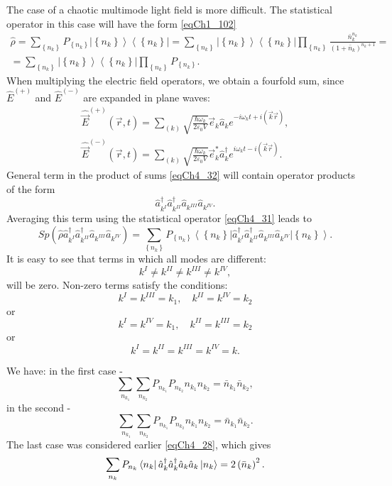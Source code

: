The case of a chaotic multimode light field is more difficult. The statistical operator in this case will have the form \eqref{eqCh1_102} 
\begin{eqnarray}
\hat{\rho} = \sum_{\left\{n_k\right\}} P_{\left\{n_k\right\}} \left|\left\{n_k\right\}\right>\left<\left\{n_k\right\}\right| = 
\sum_{\left\{n_k\right\}} 
 \left|\left\{n_k\right\}\right>\left<\left\{n_k\right\}\right|
\prod_{\left\{n_k\right\}} 
\frac{\bar{n}_k^{n_k}}{\left(1 + \bar{n}_k\right)^{n_k+1}} = 
\nonumber \\
= 
\sum_{\left\{n_k\right\}} 
 \left|\left\{n_k\right\}\right>\left<\left\{n_k\right\}\right|
\prod_{\left\{n_k\right\}} P_{\left\{n_k\right\}}.
\label{eqCh4_31}
\end{eqnarray}
When multiplying the electric field operators, we obtain a fourfold sum, since $\hat{E}^{(+)}$ and $\hat{E}^{(-)}$ are expanded in plane waves: 
\begin{eqnarray}
\hat{\vec{E}}^{(+)}\left(\vec{r}, t\right) = \sum_{(k)}
\sqrt{\frac{\hbar \omega_k}{2 \varepsilon_0 V}} \vec{e}_k \hat{a}_k
e^{-i \omega_k t + i \left(\vec{k} \vec{r}\right)},
\nonumber \\
\hat{\vec{E}}^{(-)}\left(\vec{r}, t\right) = \sum_{(k)}
\sqrt{\frac{\hbar \omega_k}{2 \varepsilon_0 V}} \vec{e}_k^{*} \hat{a}_k^{\dag}
e^{i \omega_k t - i \left(\vec{k} \vec{r}\right)}.
\label{eqCh4_32}
\end{eqnarray}
General term in the product of sums \eqref{eqCh4_32} will contain operator products of the form 
\begin{equation}
\hat{a}^{\dag}_{k^{I}}\hat{a}^{\dag}_{k^{II}}\hat{a}_{k^{III}}\hat{a}_{k^{IV}}.
\label{eqCh4_33}
\end{equation}
Averaging this term using the statistical operator \eqref{eqCh4_31} leads to
\[
Sp\left(\hat{\rho}
\hat{a}^{\dag}_{k^{I}}\hat{a}^{\dag}_{k^{II}}\hat{a}_{k^{III}}\hat{a}_{k^{IV}}
\right) = 
\sum_{\left\{n_k\right\}} P_{\left\{n_k\right\}}
\left<\left\{n_k\right\}\right|
\hat{a}^{\dag}_{k^{I}}\hat{a}^{\dag}_{k^{II}}\hat{a}_{k^{III}}\hat{a}_{k^{IV}}
\left|\left\{n_k\right\}\right>.
\]
It is easy to see that terms in which all modes are different: 
\[
k^{I} \neq k^{II} \neq k^{III} \neq k^{IV},
\]
will be zero. Non-zero terms satisfy the conditions:
\[
k^{I} = k^{III} = k_1, \quad k^{II} = k^{IV} = k_2
\]
or
\[
k^{I} = k^{IV} = k_1, \quad k^{II} = k^{III} = k_2
\]
or
\[
k^{I} = k^{II} =  k^{III} = k^{IV} = k.
\]   

We have: in the first case -
\begin{equation}
\sum_{n_{k_1}}\sum_{n_{k_2}} P_{n_{k_1}} P_{n_{k_2}} 
n_{k_1} n_{k_2} = \bar{n}_{k_1} \bar{n}_{k_2},
\label{eqCh4_34}
\end{equation}
in the second -
\begin{equation}
\sum_{n_{k_1}}\sum_{n_{k_2}} P_{n_{k_1}} P_{n_{k_2}} 
n_{k_1} n_{k_2} = \bar{n}_{k_1} \bar{n}_{k_2}.
\label{eqCh4_35}
\end{equation}
The last case was considered earlier \eqref{eqCh4_28}, which gives
\begin{equation}
\sum_{n_{k}} P_{n_{k}}
\bra{n_k}\hat{a}_k^{\dag}\hat{a}_k^{\dag}\hat{a}_k\hat{a}_k\ket{n_k}
= 2 \left(\bar{n}_k\right)^2.
\label{eqCh4_36}
\end{equation}


